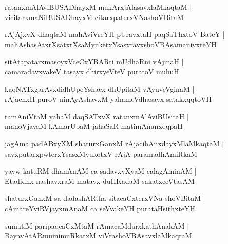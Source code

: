 \documentclass[twoside,12pt,openright]{book}
\newcounter{shloka}[chapter]
\begin{document}
\begin{shloka}%
ratanxmAlAviBUSADhayxM mukArxjAlasavxlaMkaqtaM |\\
vicitarxmaNiBUSADhayxM citarxpaterxVNashoVBitaM 
\end{shloka}

\begin{shloka}%
rAjAjxvX dhaqtaM mahAviVreYH pUravxtaH paqSaThxtoV BateY |\\
mahAshasAtxrXsatxrXsaMyuketxYsasxravxshoVBAsamanivxteYH
\end{shloka}

\begin{shloka}%
sitAtapatarxmasoyxVceCxYBARti mUdhaRni vAjinaH |\\
camaradavxyakeV tasayx dhirxyeVteV puratoV muhuH 
\end{shloka}

\begin{shloka}%
kaqNATxgarAvxdidhUpeYshacx dhUpitaM vAyuveVginaM |\\
rAjacnxH puroV ninAyAshavxM yahameVdhasayx satakxqqtoVH 
\end{shloka}

\begin{shloka}%
tamAniVtaM yahaM daqSATxvX ratanxmAlAviBUsitaH |\\
manoVjavaM kAmarUpaM jahaSaR matimAnanxqqpaH 
\end{shloka}

\begin{shloka}%
jagAma padABxyXM shaturxGanxM rAjacihAnxdayxMlaMkaqtaM |\\
savxputarxpwterxYsasxMyukotxV rAjA paramadhAmiRkaM 
\end{shloka}

\begin{shloka}%
yayw katuRM dhanAnAM ca sadavxyXyaM calagAminAM |\\
Etadidhx nashavxraM matavx duHKadaM sakatxceVtasAM 
\end{shloka}

\begin{shloka}%
shaturxGanxM sa dadashARtha sitacaCxterxVNa shoVBitaM |\\
cAmareYviRVjayxmAnaM ca seVvakeYH purataHsithxteYH
\end{shloka}

\begin{shloka}%
sumatiM paripaqcaCxMtaM rAmacaMdarxkathAnakAM |\\
BayavAtARmuinimuRkatxM viVrashoVBAsavxlaMkaqtaM 
\end{shloka}
\end{document}
